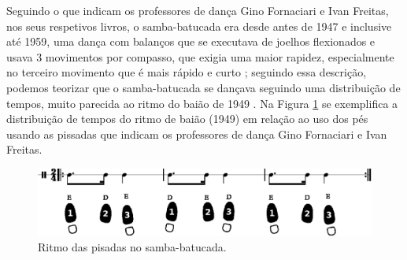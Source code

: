 \begin{itemize}
Seguindo o que indicam  os professores de dança Gino Fornaciari e Ivan Freitas,
nos seus respetivos livros, o samba-batucada era desde antes de 1947 e inclusive até 1959, 
uma dança com balanços que se executava de joelhos flexionados  
e usava 3 movimentos por compasso, que exigia uma maior rapidez, 
especialmente no terceiro movimento que é mais rápido e curto 
\cite[pp. 61]{fornaciari1947aprender} \cite[pp. 58,66]{freitas1959danca};
seguindo essa descrição, 
podemos teorizar que o samba-batucada se dançava seguindo uma distribuição de tempos,
muito parecida ao ritmo do baião de 1949 \cite{CORTES2014}.
Na Figura \ref{time:sambabatucada} se exemplifica a distribuição de tempos do ritmo de baião (1949) em relação ao uso dos pés usando as pissadas que indicam os professores de dança Gino Fornaciari e Ivan Freitas.
\begin{figure}[H]
\centering
\includegraphics[width=\textwidth]{chapters/cap-historia-sambagafieira/sambabatucada.eps}
\caption{Ritmo das pisadas no samba-batucada.}
\label{time:sambabatucada}
\end{figure}


\end{itemize}
